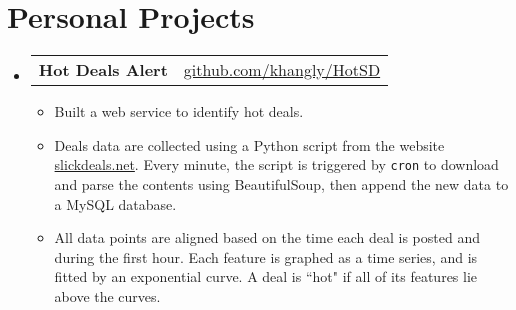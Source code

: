 \documentclass[letterpaper,11pt]{article}
\makeatletter
\newcommand{\resumeSubHeadingListStart}{\begin{itemize}[leftmargin=*]}
\newcommand{\resumeSubHeadingListEnd}{\end{itemize}}
\newcommand{\resumeItemListStart}{\begin{itemize}}
\newcommand{\resumeItemListEnd}{\end{itemize}\vspace{-5pt}}
\newcommand{\resumeSubheadingD}[2]{
  \vspace{-1pt}\item
    \begin{tabular*}{0.97\textwidth}[t]{l@{\extracolsep{\fill}}r}
      \textbf{#1} & #2 \\
    \end{tabular*}\vspace{-5pt}
}
\newcommand{\resumeItemD}[1]{
  \item\small{
    #1 \vspace{-2pt}
  }
}
\makeatother
\begin{document}
\section{Personal Projects}
\resumeSubHeadingListStart
	\resumeSubheadingD
	{Hot Deals Alert}{\href{https://github.com/khangly/HotSD}{github.com/khangly/HotSD}}
	\resumeItemListStart
		\resumeItemD
		{Built a web service to identify hot deals.}
		\resumeItemD
		{Deals data are collected using a Python script from the website \href{https://slickdeals.net}{slickdeals.net}. Every minute, the script is triggered by \texttt{cron} to download and parse the contents using BeautifulSoup, then append the new data to a MySQL database.}
		\resumeItemD
		{All data points are aligned based on the time each deal is posted and during the first hour. Each feature is graphed as a time series, and is fitted by an exponential curve. A deal is ``hot" if all of its features lie above the curves.}
	\resumeItemListEnd
\resumeSubHeadingListEnd
  
  
\end{document}

